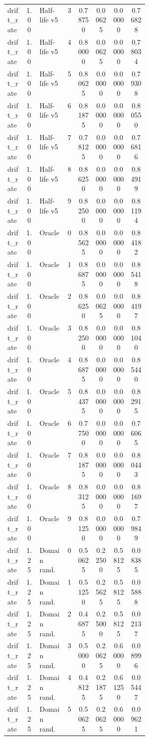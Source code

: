 \documentclass{article}
\begin{document}
\begin{center}
\begin{longtable}{p{0.13\linewidth}cp{0.20\linewidth}ccccc}
drift\_rate & 1.00 & Half-life v5 & 3 & 0.78750 & 0.00625 & 0.00000 & 0.76828\\
drift\_rate & 1.00 & Half-life v5 & 4 & 0.80000 & 0.00625 & 0.00000 & 0.78034\\
drift\_rate & 1.00 & Half-life v5 & 5 & 0.80625 & 0.00000 & 0.00000 & 0.79308\\
drift\_rate & 1.00 & Half-life v5 & 6 & 0.81875 & 0.00000 & 0.00000 & 0.80550\\
drift\_rate & 1.00 & Half-life v5 & 7 & 0.78125 & 0.00000 & 0.00000 & 0.76816\\
drift\_rate & 1.00 & Half-life v5 & 8 & 0.86250 & 0.00000 & 0.00000 & 0.84919\\
drift\_rate & 1.00 & Half-life v5 & 9 & 0.82500 & 0.00000 & 0.00000 & 0.81194\\
drift\_rate & 1.00 & Oracle & 0 & 0.85625 & 0.00000 & 0.00000 & 0.84182\\
drift\_rate & 1.00 & Oracle & 1 & 0.86875 & 0.00000 & 0.00000 & 0.85418\\
drift\_rate & 1.00 & Oracle & 2 & 0.86250 & 0.00625 & 0.00000 & 0.84197\\
drift\_rate & 1.00 & Oracle & 3 & 0.82500 & 0.00000 & 0.00000 & 0.81040\\
drift\_rate & 1.00 & Oracle & 4 & 0.86875 & 0.00000 & 0.00000 & 0.85440\\
drift\_rate & 1.00 & Oracle & 5 & 0.84375 & 0.00000 & 0.00000 & 0.82915\\
drift\_rate & 1.00 & Oracle & 6 & 0.77500 & 0.00000 & 0.00000 & 0.76065\\
drift\_rate & 1.00 & Oracle & 7 & 0.81875 & 0.00000 & 0.00000 & 0.80443\\
drift\_rate & 1.00 & Oracle & 8 & 0.83125 & 0.00000 & 0.00000 & 0.81697\\
drift\_rate & 1.00 & Oracle & 9 & 0.81250 & 0.00000 & 0.00000 & 0.79849\\
drift\_rate & 1.25 & Domain rand. & 0 & 0.50625 & 0.22500 & 0.58125 & 0.08385\\
drift\_rate & 1.25 & Domain rand. & 1 & 0.51250 & 0.25625 & 0.58125 & 0.05888\\
drift\_rate & 1.25 & Domain rand. & 2 & 0.46875 & 0.25000 & 0.58125 & 0.02137\\
drift\_rate & 1.25 & Domain rand. & 3 & 0.50000 & 0.20625 & 0.60000 & 0.08996\\
drift\_rate & 1.25 & Domain rand. & 4 & 0.48125 & 0.21875 & 0.61250 & 0.05447\\
drift\_rate & 1.25 & Domain rand. & 5 & 0.50625 & 0.20625 & 0.60000 & 0.09621\\

\end{longtable}
\end{center}
\end{document}
